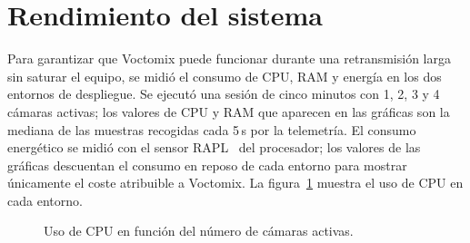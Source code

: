 \section{Rendimiento del sistema}
\label{sec:rendimiento_sistema}

Para garantizar que Voctomix puede funcionar durante una retransmisión larga sin
saturar el equipo, se midió el consumo de CPU, RAM y energía en los dos entornos
de despliegue. Se ejecutó una sesión de cinco minutos con 1, 2, 3 y 4 cámaras
activas; los valores de CPU y RAM que aparecen en las gráficas son la mediana
de las muestras recogidas cada 5\,s por la telemetría. El consumo energético
se midió con el sensor \ac{RAPL}~\cite{khan2018rapl} del procesador; los valores
de las gráficas descuentan el consumo en reposo de cada entorno para mostrar
únicamente el coste atribuible a Voctomix.
La figura~\ref{fig:cpu_camaras} muestra el uso de CPU en cada entorno.

\begin{figure}[H]
  \centering
  \caption{Uso de CPU en función del número de cámaras activas.}
  \label{fig:cpu_camaras}
\end{figure}

